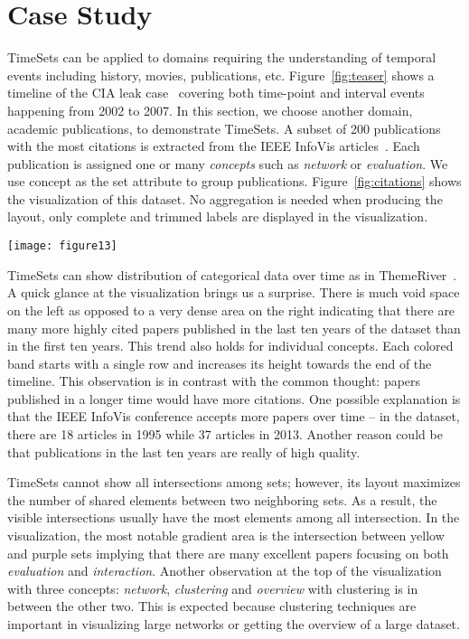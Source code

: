\section{Case Study}

TimeSets can be applied to domains requiring the understanding of temporal events including history, movies, publications, etc. Figure~\ref{fig:teaser} shows a timeline of the CIA leak case~\cite{CIA2007} covering both time-point and interval events happening from 2002 to 2007. In this section, we choose another domain, academic publications, to demonstrate TimeSets. A subset of 200 publications with the most citations is extracted from the IEEE InfoVis articles~\cite{Stasko2013}. Each publication is assigned one or many \textit{concepts} such as \textit{network} or \textit{evaluation}. We use concept as the set attribute to group publications. Figure~\ref{fig:citations} shows the visualization of this dataset. No aggregation is needed when producing the layout, only complete and trimmed labels are displayed in the visualization.

\begin{figure*}[ht]
\centering
\texttt{[image: figure13]}
\caption{TimeSets visualization of 200 publications with the most citations in the IEEE InfoVis conference from 1995 to 2013. Concepts are used to group publications and only eight concepts appearing most in those publications are shown (see the legend in the top left corner).}
\label{fig:citations}
\end{figure*}

TimeSets can show distribution of categorical data over time as in ThemeRiver~\cite{Havre2002}. A quick glance at the visualization brings us a surprise. There is much void space on the left as opposed to a very dense area on the right indicating that there are many more highly cited papers published in the last ten years of the dataset than in the first ten years. This trend also holds for individual concepts. Each colored band starts with a single row and increases its height towards the end of the timeline. This observation is in contrast with the common thought: papers published in a longer time would have more citations. One possible explanation is that the IEEE InfoVis conference accepts more papers over time -- in the dataset, there are 18 articles in 1995 while 37 articles in 2013. Another reason could be that publications in the last ten years are really of high quality.

TimeSets cannot show all intersections among sets; however,  its layout maximizes the number of shared elements between two neighboring sets. As a result, the visible intersections usually have the most elements among all intersection. In the visualization, the most notable gradient area is the intersection between yellow and purple sets implying that there are many excellent papers focusing on both \textit{evaluation} and \textit{interaction}. Another observation at the top of the visualization with three concepts: \textit{network}, \textit{clustering} and \textit{overview} with clustering is in between the other two. This is expected because clustering techniques are important in visualizing large networks or getting the overview of a large dataset.


